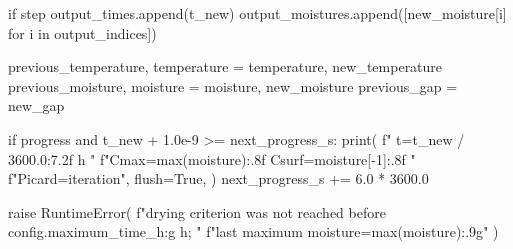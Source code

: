 \documentclass[withoutpreface,bwprint]{cumcmthesis}
\begin{document}
\begin{PythonCode}
        if step %
            output_times.append(t_new)
            output_moistures.append([new_moisture[i] for i in output_indices])

        previous_temperature, temperature = temperature, new_temperature
        previous_moisture, moisture = moisture, new_moisture
        previous_gap = new_gap

        if progress and t_new + 1.0e-9 >= next_progress_s:
            print(
                f"  t={t_new / 3600.0:7.2f} h  "
                f"Cmax={max(moisture):.8f}  Csurf={moisture[-1]:.8f}  "
                f"Picard={iteration}",
                flush=True,
            )
            next_progress_s += 6.0 * 3600.0

    raise RuntimeError(
        f"drying criterion was not reached before {config.maximum_time_h:g} h; "
        f"last maximum moisture={max(moisture):.9g}"
    )
\end{PythonCode}
\end{document}
